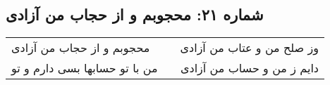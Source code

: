 \begin{center}
\section*{شماره ۲۱: محجوبم و از حجاب من آزادی}
\label{sec:021}
\begin{longtable}{l p{0.5cm} r}
محجوبم و از حجاب من آزادی
&&
وز صلح من و عتاب من آزادی
\\
من با تو حسابها بسی دارم و تو
&&
دایم ز من و حساب من آزادی
\\
\end{longtable}
\end{center}
